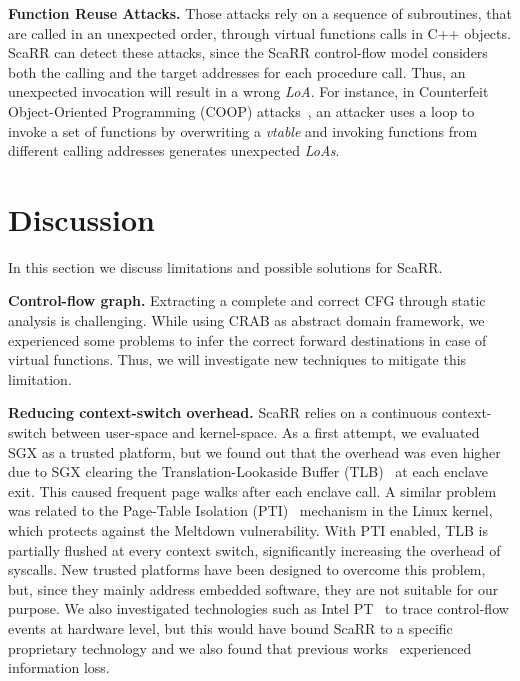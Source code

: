 \textbf{Function Reuse Attacks.}
Those attacks rely on a sequence of subroutines, that are called in an 
unexpected order, \eg through virtual functions calls in C++ objects. ScaRR can 
detect these attacks, since the ScaRR control-flow model considers both the 
calling and the target addresses for each procedure call. Thus, an unexpected 
invocation will result in a wrong \emph{LoA}.
For instance, in Counterfeit Object-Oriented Programming (COOP) 
attacks~\cite{schuster2015counterfeit}, an attacker uses a loop to invoke a set 
of functions by overwriting a \emph{vtable} and invoking functions from 
different calling addresses generates unexpected \emph{LoAs}.

\section{Discussion}
\label{sec:discussion}
In this section we discuss limitations and possible solutions for ScaRR.

\textbf{Control-flow graph.}
Extracting a complete and correct CFG through static analysis is challenging.
While using CRAB as abstract domain framework, we experienced some problems
to infer the correct forward destinations in case of virtual functions. Thus, 
we will investigate new techniques to mitigate this limitation.

\textbf{Reducing context-switch overhead.}
ScaRR relies on a continuous context-switch between user-space and kernel-space.
As a first attempt, we evaluated SGX as a trusted platform, but we found out 
that the overhead was even higher due to SGX clearing the Translation-Lookaside 
Buffer (TLB)~\cite{stravers2013translation} at each enclave exit.
This caused frequent page walks after each enclave call.
A similar problem was related to the Page-Table Isolation 
(PTI)~\cite{watson2018capability} mechanism in the Linux kernel, which protects 
against the Meltdown vulnerability. 
With PTI enabled, TLB is partially flushed at every context switch, 
significantly increasing the overhead of syscalls.
New trusted platforms have been designed to overcome this problem, but, since 
they mainly address embedded software, they are not suitable for our purpose.
We also investigated technologies such as Intel 
PT~\cite{Ge:2017:GGC:3037697.3037716} to trace 
control-flow events at hardware level, but this would have bound ScaRR to a 
specific proprietary technology and we also found that previous 
works~\cite{Ge:2017:GGC:3037697.3037716,Hu:2018:EUC:3243734.3243797} 
experienced information loss.

